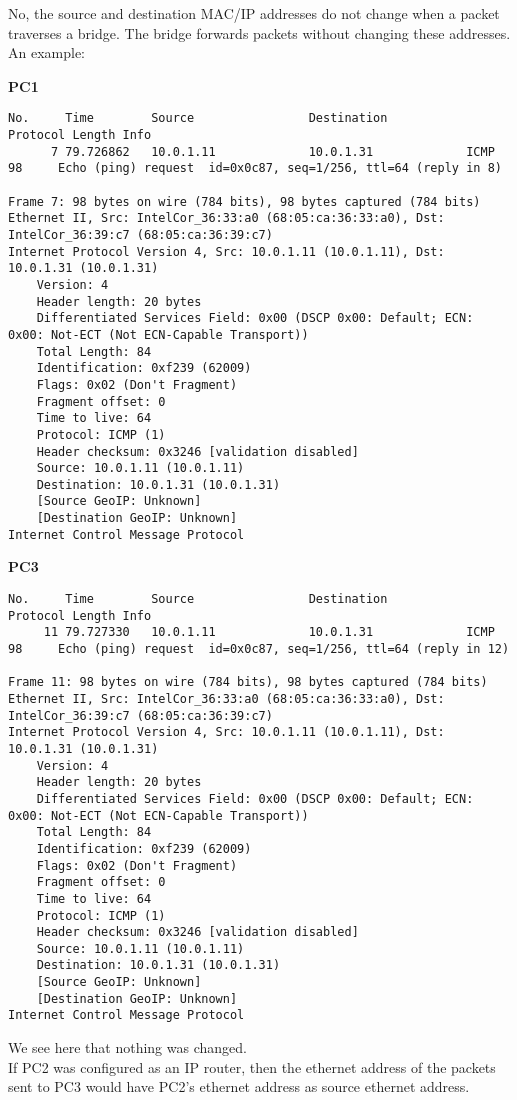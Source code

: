 No, the source and destination MAC/IP addresses do not change when a packet traverses a bridge.
The bridge forwards packets without changing these addresses. \\

An example:

\textbf{PC1}
\begin{lstlisting}
No.     Time        Source                Destination           Protocol Length Info
      7 79.726862   10.0.1.11             10.0.1.31             ICMP     98     Echo (ping) request  id=0x0c87, seq=1/256, ttl=64 (reply in 8)

Frame 7: 98 bytes on wire (784 bits), 98 bytes captured (784 bits)
Ethernet II, Src: IntelCor_36:33:a0 (68:05:ca:36:33:a0), Dst: IntelCor_36:39:c7 (68:05:ca:36:39:c7)
Internet Protocol Version 4, Src: 10.0.1.11 (10.0.1.11), Dst: 10.0.1.31 (10.0.1.31)
    Version: 4
    Header length: 20 bytes
    Differentiated Services Field: 0x00 (DSCP 0x00: Default; ECN: 0x00: Not-ECT (Not ECN-Capable Transport))
    Total Length: 84
    Identification: 0xf239 (62009)
    Flags: 0x02 (Don't Fragment)
    Fragment offset: 0
    Time to live: 64
    Protocol: ICMP (1)
    Header checksum: 0x3246 [validation disabled]
    Source: 10.0.1.11 (10.0.1.11)
    Destination: 10.0.1.31 (10.0.1.31)
    [Source GeoIP: Unknown]
    [Destination GeoIP: Unknown]
Internet Control Message Protocol
\end{lstlisting}

\textbf{PC3}
\begin{lstlisting}
No.     Time        Source                Destination           Protocol Length Info
     11 79.727330   10.0.1.11             10.0.1.31             ICMP     98     Echo (ping) request  id=0x0c87, seq=1/256, ttl=64 (reply in 12)

Frame 11: 98 bytes on wire (784 bits), 98 bytes captured (784 bits)
Ethernet II, Src: IntelCor_36:33:a0 (68:05:ca:36:33:a0), Dst: IntelCor_36:39:c7 (68:05:ca:36:39:c7)
Internet Protocol Version 4, Src: 10.0.1.11 (10.0.1.11), Dst: 10.0.1.31 (10.0.1.31)
    Version: 4
    Header length: 20 bytes
    Differentiated Services Field: 0x00 (DSCP 0x00: Default; ECN: 0x00: Not-ECT (Not ECN-Capable Transport))
    Total Length: 84
    Identification: 0xf239 (62009)
    Flags: 0x02 (Don't Fragment)
    Fragment offset: 0
    Time to live: 64
    Protocol: ICMP (1)
    Header checksum: 0x3246 [validation disabled]
    Source: 10.0.1.11 (10.0.1.11)
    Destination: 10.0.1.31 (10.0.1.31)
    [Source GeoIP: Unknown]
    [Destination GeoIP: Unknown]
Internet Control Message Protocol
\end{lstlisting}

We see here that nothing was changed.\\

If PC2 was configured as an IP router,
then the ethernet address of the packets sent to PC3 would have PC2's ethernet address as source ethernet address.

